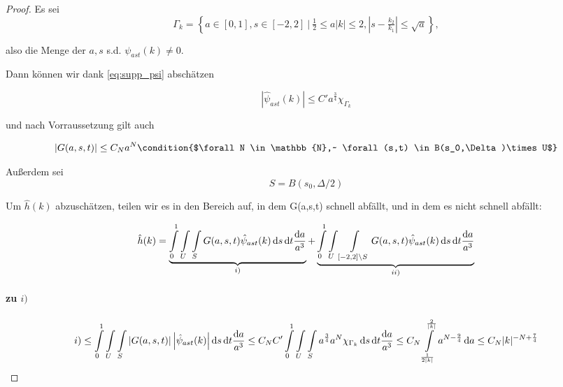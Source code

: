 \begin{proof}
Es sei
\begin{equation*}
    \Gamma_k = \left\{a\in [0,1], s \in [-2,2] ~\Big|~ \tfrac{1}{2} \leq a|k| \leq 2 , \left|s-\tfrac{k_2}{k_1} \right| \leq \sqrt a
                   \right\},
\end{equation*}

also die Menge der $a,s$ s.d. $\psi_{ast}(k) \neq 0$.

Dann können wir dank \cref{eq:supp_psi} abschätzen

\begin{equation*}
    | \hat \psi_{ast} (k)| \leq C' a^{\frac{3}{4}} \chi_{\Gamma_k}
\end{equation*}

und nach Vorraussetzung gilt auch

\begin{equation*}
    |G(a,s,t)| \leq C_{N} a^{N}
    \condition{$\forall N \in \mathbb{N},~ \forall (s,t) \in B(s_0,\Delta)\times U$}
\end{equation*}

Außerdem sei
\begin{equation*}
    S = B(s_0,\Delta/2)
\end{equation*}

Um $\hat h(k)$ abzuschätzen, teilen wir es in den Bereich auf, in dem G(a,s,t) schnell abfällt, und in dem es nicht schnell abfällt:

\begin{dmath*}
    \hat h(k) =
    \underbrace{
    \int \limits_0^1 \int \limits_U \int \limits_{S}
    G(a,s,t) \hat \psi_{ast} (k)
        \d s \d t \frac{\d a}{a^3}}_{i)}
     +
    \underbrace{
     \int \limits_0^1 \int \limits_U \int \limits_{[-2,2]\setminus S}
    G(a,s,t) \hat \psi_{ast} (k)
        \d s \d t \frac{\d a}{a^3}}_{ii)}
\end{dmath*}



\paragraph{zu $i)$}
\begin{dmath*}
    i) \leq \int \limits_0^1 \int \limits_U \int \limits_{S}
    \left\lvert G(a,s,t)\right\rvert
    \left\lvert \hat \psi_{ast} (k) \right\rvert
        \d s \d t \frac{\d a}{a^3}
    \leq
    C_N C'
    \int \limits_0^1 \int \limits_U \int \limits_{S}
    a^{\frac{3}{4}} a^N \chi_{\Gamma_k} \d s \d t \frac{\d a}{a^3}
    \leq
    C_N \int \limits_{\frac{1}{2|k|}}^{\frac{2}{|k|}}
    a^{N-\frac{9}{4}} \d a
    \le C_N |k|^{-N+\frac{7}{4}}
\end{dmath*}


\end{proof}
